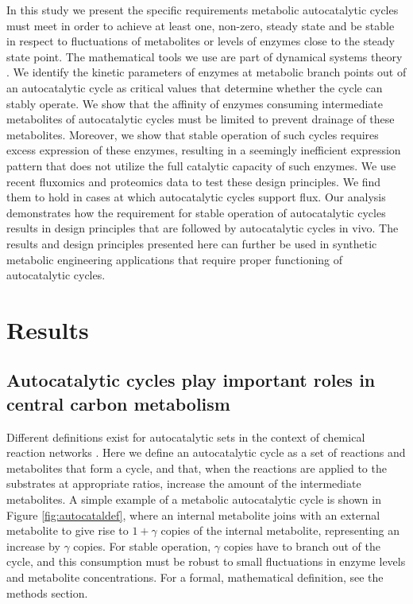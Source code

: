     In this study we present the specific requirements metabolic autocatalytic cycles must meet in order to achieve at least one, non-zero, steady state and be stable in respect to fluctuations of metabolites or levels of enzymes close to the steady state point.
    The mathematical tools we use are part of dynamical systems theory \cite{Strogatz2014-hp}.
    We identify the kinetic parameters of enzymes at metabolic branch points out of an autocatalytic cycle as critical values that determine whether the cycle can stably operate.
    We show that the affinity of enzymes consuming intermediate metabolites of autocatalytic cycles must be limited to prevent drainage of these metabolites.
    Moreover, we show that stable operation of such cycles requires excess expression of these enzymes, resulting in a seemingly inefficient expression pattern that does not utilize the full catalytic capacity of such enzymes.
    We use recent fluxomics and proteomics data to test these design principles.
    We find them to hold in cases at which autocatalytic cycles support flux.
    Our analysis demonstrates how the requirement for stable operation of autocatalytic cycles results in design principles that are followed by autocatalytic cycles in vivo.
    The results and design principles presented here can further be used in synthetic metabolic engineering applications that require proper functioning of autocatalytic cycles.

\section{Results}
\subsection{Autocatalytic cycles play important roles in central carbon metabolism}
Different definitions exist for autocatalytic sets in the context of chemical reaction networks \cite{Hordijk2004-xe, Eigen2012-ti, Kun2008-xg}.
Here we define an autocatalytic cycle as a set of reactions and metabolites that form a cycle, and that, when the reactions are applied to the substrates at appropriate ratios, increase the amount of the intermediate metabolites.
A simple example of a metabolic autocatalytic cycle is shown in Figure \ref{fig:autocataldef}, where an internal metabolite joins with an external metabolite to give rise to $1+\gamma$ copies of the internal metabolite, representing an increase by $\gamma$ copies.
For stable operation, $\gamma$ copies have to branch out of the cycle, and this consumption must be robust to small fluctuations in enzyme levels and metabolite concentrations.
For a formal, mathematical definition, see the methods section.

